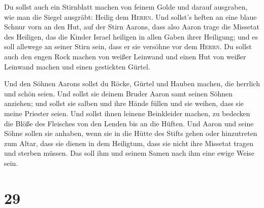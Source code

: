  Du sollst auch ein Stirnblatt machen von feinem Golde
und darauf ausgraben, wie man die Siegel ausgräbt: Heilig dem
\textsc{Herrn}.  Und sollst's heften an eine blaue Schnur
vorn an den Hut,  auf der Stirn Aarons, dass also Aaron
trage die Missetat des Heiligen, das die Kinder Israel heiligen in allen
Gaben ihrer Heiligung; und es soll allewege an seiner Stirn sein, dass
er sie versöhne vor dem \textsc{Herrn}.  Du sollst auch
den engen Rock machen von weißer Leinwand und einen Hut von weißer
Leinwand machen und einen gestickten Gürtel.

 Und den Söhnen Aarons sollst du Röcke, Gürtel und Hauben
machen, die herrlich und schön seien.  Und sollst sie
deinem Bruder Aaron samt seinen Söhnen anziehen; und sollst sie salben
und ihre Hände füllen und sie weihen, dass sie meine Priester seien.
 Und sollst ihnen leinene Beinkleider machen, zu bedecken
die Blöße des Fleisches von den Lenden bis an die Hüften.
 Und Aaron und seine Söhne sollen sie anhaben, wenn sie
in die Hütte des Stifts gehen oder hinzutreten zum Altar, dass sie
dienen in dem Heiligtum, dass sie nicht ihre Missetat tragen und sterben
müssen. Das soll ihm und seinem Samen nach ihm eine ewige Weise sein.

\hypertarget{section-28}{%
\section{29}\label{section-28}}

